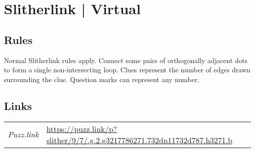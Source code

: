 \section[Slitherlink | Virtual {[\emph{Slitherlink}]}]{Slitherlink | {\normalfont Virtual}}
\label{sec:47-slitherlink-virtual}

\subsection*{Rules}
\begin{markdown}
Normal Slitherlink rules apply.  Connect some pairs of orthogonally adjacent dots to form a single non-intersecting loop. Clues represent the number of edges drawn surrounding the clue. Question marks can represent any number.
\end{markdown}
\subsection*{Links}
\begin{tabularx}{\textwidth}{l X}
\emph{Puzz.link} & \url{https://puzz.link/p?slither/9/7/.g.2.g3217786271.732dn11732d787.h3271.b} \\
\end{tabularx}
\pagebreak
